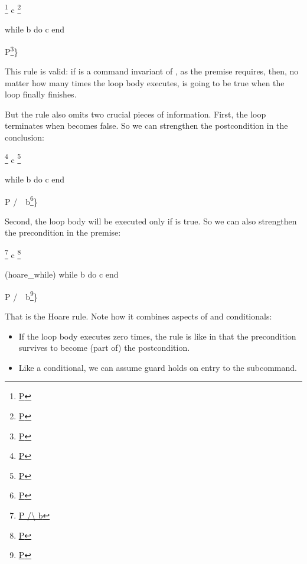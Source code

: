 \documentclass[12pt]{report}
\begin{document}
             \footnote{\url{P}} c \footnote{\url{P}}
\par
\noindent\hrulefill\par
\noindent{}
       while b do c end {{P\footnote{\url{P}}\}


    This rule is valid: if  is a command invariant of , as the
    premise requires, then, no matter how many times the loop body
    executes,  is going to be true when the loop finally finishes.


    But the rule also omits two crucial pieces of information.  First,
    the loop terminates when  becomes false.  So we can strengthen
    the postcondition in the conclusion:


              \footnote{\url{P}} c \footnote{\url{P}}
\par
\noindent\hrulefill\par
\noindent{}
       while b do c end {{P /\ ~b\footnote{\url{P}}\}


    Second, the loop body will be executed only if  is true.  So we
    can also strengthen the precondition in the premise:


            \footnote{\url{P /\ b}} c \footnote{\url{P}}
\par
\noindent\hrulefill\par
\noindent{} (hoare\_while)
       while b do c end {{P /\ ~b\footnote{\url{P}}\}


 That is the Hoare  rule.  Note how it combines
    aspects of  and conditionals:



\begin{itemize}
\item  If the loop body executes zero times, the rule is like  in
      that the precondition survives to become (part of) the
      postcondition.



\item  Like a conditional, we can assume guard  holds on entry to
      the subcommand. 


\end{itemize}}}}}}}
\end{document}
